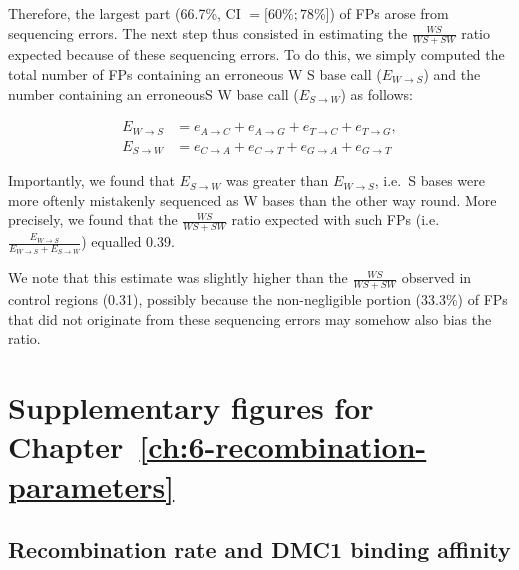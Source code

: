 Therefore, the largest part (66.7\%, CI $= [60\%; 78\%$]) of FPs arose from sequencing errors.
The next step thus consisted in estimating the $\frac{WS}{WS+SW}$ ratio expected because of these sequencing errors.
To do this, we simply computed the total number of FPs containing an erroneous W\textrightarrow{} S base call ($E_{W\rightarrow S}$) and the number containing an erroneousS\textrightarrow{} W base call ($E_{S\rightarrow W}$) as follows:

\begin{align}
        E_{W\rightarrow S}&= e_{A\rightarrow C} + e_{A\rightarrow G} + e_{T\rightarrow C} + e_{T\rightarrow G}, \\
        E_{S\rightarrow W}&= e_{C\rightarrow A} + e_{C\rightarrow T} + e_{G\rightarrow A} + e_{G\rightarrow T}
\end{align}

Importantly, we found that $E_{S\rightarrow W}$ was greater than $E_{W\rightarrow S}$, i.e.\ S bases were more oftenly mistakenly sequenced as W bases than the other way round.
More precisely, we found that the $\frac{WS}{WS+SW}$ ratio expected with such FPs (i.e.\ $\frac{E_{W\rightarrow S}}{E_{W\rightarrow S} + E_{S\rightarrow W}}$) equalled 0.39.

We note that this estimate was slightly higher than the $\frac{WS}{WS+SW}$ observed in control regions (0.31), possibly because the non-negligible portion (33.3\%) of FPs that did not originate from these sequencing errors may somehow also bias the ratio.









%
%



\hypersetup{linkcolor=titlepagecolorsection}
\section{Supplementary figures for Chapter~\ref{ch:6-recombination-parameters}}
\hypersetup{linkcolor=black}

\subsection{Recombination rate and DMC1 binding affinity}

